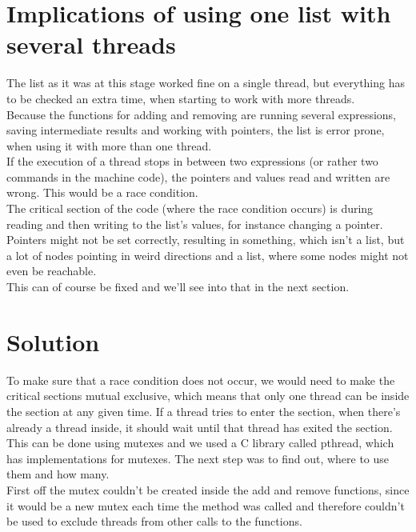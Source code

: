 \section{Implications of using one list with several threads}
The list as it was at this stage worked fine on a single thread, but everything has to be checked an extra time, when starting to work with more threads.\\

Because the functions for adding and removing are running several expressions, saving intermediate results and working with pointers, the list is error prone, when using it with more than one thread.\\

If the execution of a thread stops in between two expressions (or rather two commands in the machine code), the pointers and values read and written are wrong. This would be a race condition.\\

The critical section of the code (where the race condition occurs) is during reading and then writing to the list's values, for instance changing a pointer. Pointers might not be set correctly, resulting in something, which isn't a list, but a lot of nodes pointing in weird directions and a list, where some nodes might not even be reachable.\\

This can of course be fixed and we'll see into that in the next section.

\section{Solution}
To make sure that a race condition does not occur, we would need to make the critical sections mutual exclusive, which means that only one thread can be inside the section at any given time. If a thread tries to enter the section, when there's already a thread inside, it should wait until that thread has exited the section.\\

This can be done using mutexes and we used a C library called pthread, which has implementations for mutexes. The next step was to find out, where to use them and how many.\\

First off the mutex couldn't be created inside the add and remove functions, since it would be a new mutex each time the method was called and therefore couldn't be used to exclude threads from other calls to the functions.\\

